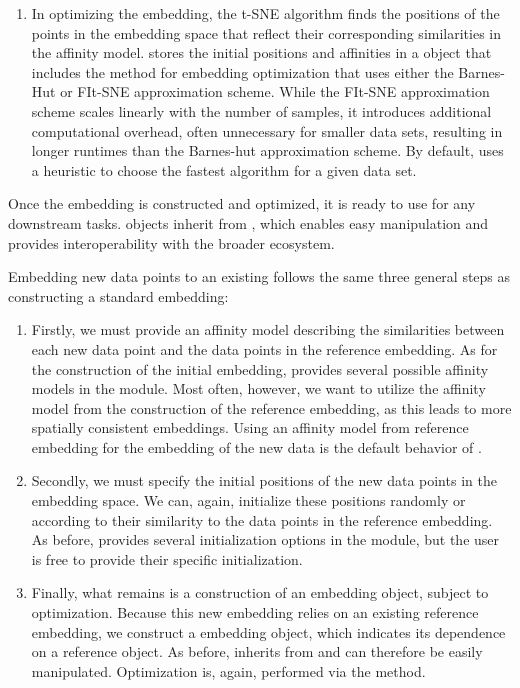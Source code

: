 \documentclass[article]{jss}
\newcommand{\opentsne}{\pkg{openTSNE}\xspace}
\begin{document}
\begin{enumerate}
\item In optimizing the embedding, the t-SNE algorithm finds the positions of the points in the embedding space that reflect their corresponding similarities in the affinity model. \opentsne stores the initial positions and affinities in a  object that includes the  method for embedding optimization that uses either the Barnes-Hut or FIt-SNE approximation scheme. While the FIt-SNE approximation scheme scales linearly with the number of samples, it introduces additional computational overhead, often unnecessary for smaller data sets, resulting in longer runtimes than the Barnes-hut approximation scheme. By default, \opentsne uses a heuristic to choose the fastest algorithm for a given data set.
\end{enumerate}

Once the embedding is constructed and optimized, it is ready to use for any downstream tasks.  objects inherit from , which enables easy manipulation and provides interoperability with the broader  ecosystem.

Embedding new data points to an existing 
follows the same three general steps as constructing a standard embedding:
\begin{enumerate}
\item Firstly, we must provide an affinity model describing the similarities between each new data point and the data points in the reference embedding. As for the construction of the initial embedding, \opentsne provides several possible affinity models in the  module. Most often, however, we want to utilize the affinity model from the construction of the reference embedding, as this leads to more spatially consistent embeddings. Using an affinity model from reference embedding for the embedding of the new data is the default behavior of \opentsne.


\item Secondly, we must specify the initial positions of the new data points in the embedding space. We can, again, initialize these positions randomly or according to their similarity to the data points in the reference embedding. As before, \opentsne provides several initialization options in the  module, but the user is free to provide their specific initialization.

\item Finally, what remains is a construction of an embedding object, subject to optimization. Because this new embedding relies on an existing reference embedding, we construct a  embedding object, which indicates its dependence on a reference  object. As before,  inherits from  and can therefore be easily manipulated. Optimization is, again, performed via the  method.
\end{enumerate}
\end{document}
